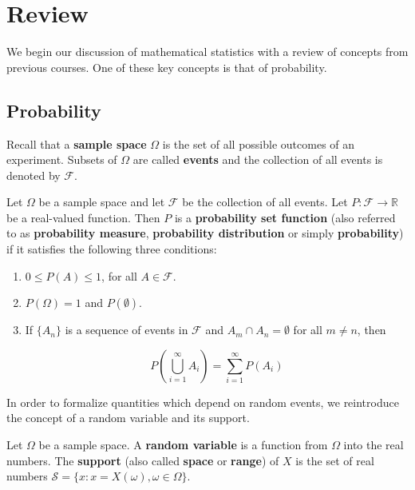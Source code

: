 \section{Review}

We begin our discussion of mathematical statistics with a review of concepts from previous courses. One of these key concepts is that of probability.

\subsection{Probability}

Recall that a \textbf{sample space} $\Omega$ is the set of all possible outcomes of an experiment. Subsets of $\Omega$ are called \textbf{events} and the collection of all events is denoted by $\mathcal F$.

\begin{definition}
	Let $\Omega$ be a sample space and let $\mathcal F$ be the collection of all events. Let $P:\mathcal F\to\mathbb R$ be a real-valued function. Then $P$ is a \textbf{probability set function} (also referred to as \textbf{probability measure}, \textbf{probability distribution} or simply \textbf{probability}) if it satisfies the following three conditions:
	\begin{enumerate}
		\item $0\leq P(A)\leq 1$, for all $A\in\mathcal F$.
		\item $P(\Omega)=1$ and $P(\emptyset)$.
		\item If $\{A_n\}$ is a sequence of events in $\mathcal F$ and $A_m\cap A_n=\emptyset$ for all $m\neq n$, then

		$$P\left(\bigcup_{i=1}^\infty A_i\right)=\sum_{i=1}^\infty P(A_i)$$
	\end{enumerate}
\end{definition}

In order to formalize quantities which depend on random events, we reintroduce the concept of a random variable and its support.

\begin{definition}
	Let $\Omega$ be a sample space. A \textbf{random variable} is a function from $\Omega$ into the real numbers. The \textbf{support} (also called \textbf{space} or \textbf{range}) of $X$ is the set of real numbers $\mathcal S=\{x:x=X(\omega),\omega\in \Omega\}$.
\end{definition}

